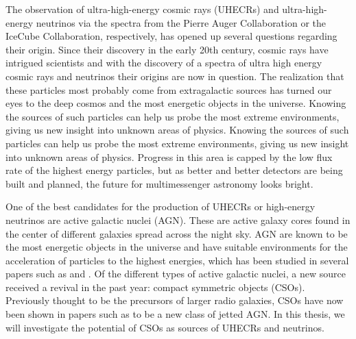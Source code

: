 


The observation of ultra-high-energy cosmic rays (UHECRs) and ultra-high-energy neutrinos via the spectra from the Pierre Auger Collaboration or the IceCube Collaboration, respectively, has opened up several questions regarding their origin. Since their discovery in the early 20th century, cosmic rays have intrigued scientists and with the discovery of a spectra of ultra high energy cosmic rays and neutrinos their origins are now in question. The realization that these particles most probably come from extragalactic sources has turned our eyes to the deep cosmos and the most energetic objects in the universe. Knowing the sources of such particles can help us probe the most extreme environments, giving us new insight into unknown areas of physics.
 Knowing the sources of such particles can help us probe the most extreme environments, giving us new insight into unknown areas of physics. Progress in this area is capped by the low flux rate of the highest energy particles, but as better and better detectors are being built and planned, the future for multimessenger astronomy looks bright.

One of the best candidates for the production of UHECRs or high-energy neutrinos are active galactic nuclei (AGN). These are active galaxy cores found in the center of different galaxies spread across the night sky. AGN are known to be the most energetic objects in the universe and have suitable environments for the acceleration of particles to the highest energies, which has been studied in several papers such as \cite{PhysRevD.90.023007} and \cite{PhysRevLett.126.191101}. Of the different types of active galactic nuclei, a new source received a revival in the past year: compact symmetric objects (CSOs). Previously thought to be the precursors of larger radio galaxies, CSOs have now been shown in papers such as \cite{kiehlmann2023compact} to be a new class of jetted AGN. In this thesis, we will investigate the potential of CSOs as sources of UHECRs and neutrinos.










